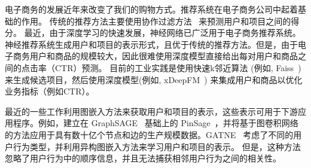 
电子商务的发展近年来改变了我们的购物方式。推荐系统在电子商务公司中起着基础的作用。
传统的推荐方法主要使用协作过滤方法~\cite{sarwar2001item,schafer2007collaborative} 来预测用户和项目之间的得分。 最近，由于深度学习的快速发展，神经网络已广泛用于电子商务推荐系统。 神经推荐系统生成用户和项目的表示形式，且优于传统的推荐方法。但是，由于电子商务用户和商品的规模较大，因此很难使用深度模型直接给出每对用户和商品之间的点击率（CTR）预测。 目前的工业实践是使用快速k邻近算法 (例如, Faiss~\cite{JDH17}) 来生成候选项目，然后使用深度模型(例如, xDeepFM~\cite{lian2018xdeepfm}) 来集成用户和商品以优化业务指标（例如CTR）。


最近的一些工作利用图嵌入方法来获取用户和项目的表示，这些表示可用于下游应用程序。例如，建立在 GraphSAGE~\cite{hamilton2017inductive} 基础上的 PinSage~\cite{ying2018graph}，并将基于图卷积网络的方法应用于具有数十亿个节点和边的生产规模数据。GATNE~\cite{cen2019representation} 考虑了不同的用户行为类型，并利用异构图嵌入方法来学习用户和项目的表示。 但是，这种方法忽略了用户行为中的顺序信息，并且无法捕获相邻用户行为之间的相关性。 %

